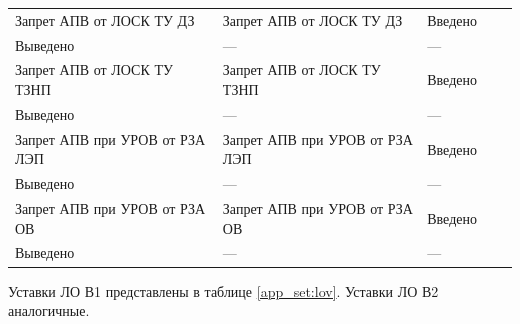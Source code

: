 \begin{longtable}{|>{\centering\arraybackslash}m{5.3cm}|>{\centering\arraybackslash}m{3.3cm}|>{\centering\arraybackslash}m{4.2cm}|>{\centering\arraybackslash}m{1.8cm}|>{\centering\arraybackslash}m{1cm}|}
\hline
\raggedright Запрет АПВ от ЛОСК ТУ ДЗ & \centering Запрет АПВ от ЛОСК ТУ ДЗ & \centering Введено \\ Выведено & \centering --- & \centering \arraybackslash --- \\
\hline
\raggedright Запрет АПВ от ЛОСК ТУ ТЗНП & \centering Запрет АПВ от ЛОСК ТУ ТЗНП & \centering Введено \\ Выведено & \centering --- & \centering \arraybackslash --- \\
\hline
\raggedright Запрет АПВ при УРОВ от РЗА ЛЭП & \centering Запрет АПВ при УРОВ от РЗА ЛЭП & \centering Введено \\ Выведено & \centering --- & \centering \arraybackslash --- \\
\hline
\raggedright Запрет АПВ при УРОВ от РЗА ОВ & \centering Запрет АПВ при УРОВ от РЗА ОВ & \centering Введено \\ Выведено & \centering --- & \centering \arraybackslash --- \\
\hline
\end{longtable}
\normalsize




\par
Уставки ЛО В1 представлены в таблице \ref{app_set:lov}. Уставки ЛО В2 аналогичные.

